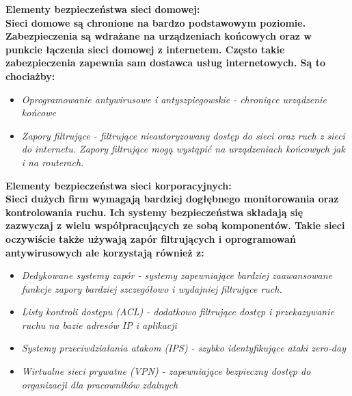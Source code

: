 \documentclass[a4paper,12pt]{article}
\newcommand{\h}[1]{\noindent \bf #1 \rm \\ \noindent}
\newcommand{\italic}[1]{\it #1 \rm}
\begin{document}
\h{Elementy bezpieczeństwa sieci domowej:}
Sieci domowe są chronione na bardzo podstawowym poziomie. Zabezpieczenia są wdrażane na urządzeniach końcowych oraz w punkcie łączenia sieci domowej z internetem. Często takie zabezpieczenia zapewnia sam dostawca usług internetowych. Są to chociażby:
\begin{itemize}
	\item \italic{Oprogramowanie antywirusowe i antyszpiegowskie} - chroniące urządzenie końcowe
	\item \italic{Zapory filtrujące} - filtrujące nieautoryzowany dostęp do sieci oraz ruch z sieci do internetu. Zapory filtrujące mogą wystąpić na urządzeniach końcowych jak i na routerach. 
\end{itemize}
\vspace{5mm}

\h{Elementy bezpieczeństwa sieci korporacyjnych:}
Sieci dużych firm wymagają bardziej dogłębnego monitorowania oraz kontrolowania ruchu. Ich systemy bezpieczeństwa składają się zazwyczaj z wielu współpracujących ze sobą komponentów. Takie sieci oczywiście także używają zapór filtrujących i oprogramowań antywirusowych ale korzystają również z:
\begin{itemize}
	\item \italic{Dedykowane systemy zapór} - systemy zapewniające bardziej zaawansowane funkcje zapory bardziej szczegółowo i wydajniej filtrujące ruch.
	\item \italic{Listy kontroli dostępu (ACL)} - dodatkowo filtrujące dostęp i przekazywanie ruchu na bazie adresów IP i aplikacji
	\item \italic{Systemy przeciwdziałania atakom (IPS)} - szybko identyfikujące ataki zero-day
	\item \italic{Wirtualne sieci prywatne (VPN)} - zapewniające bezpieczny dostęp do organizacji dla pracowników zdalnych 
\end{itemize}
	
\end{document}
